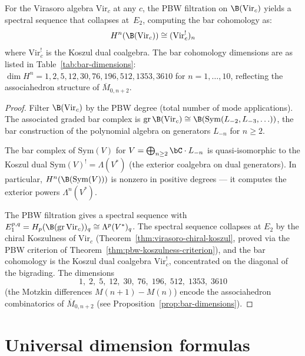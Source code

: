 \begin{proposition}
\label{prop:virasoro-koszul-acyclic}
For the Virasoro algebra $\mathrm{Vir}_c$ at any $c$, the PBW filtration
on $\B(\mathrm{Vir}_c)$ yields a spectral sequence that collapses
at~$E_2$, computing the bar cohomology as:
\begin{equation}\label{eq:virasoro-koszul-acyclic}
H^n(\B(\mathrm{Vir}_c)) \cong (\mathrm{Vir}_c^!)_n
\end{equation}
where $\mathrm{Vir}_c^!$ is the Koszul dual coalgebra.
The bar cohomology dimensions are as listed in
Table~\textup{\ref{tab:bar-dimensions}}:
$\dim H^n = 1, 2, 5, 12, 30, 76, 196, 512, 1353, 3610$ for $n = 1, \ldots, 10$,
reflecting the associahedron structure of
$\overline{M}_{0,n+2}$.
\end{proposition}

\begin{proof}
Filter $\B(\mathrm{Vir}_c)$ by the PBW degree (total number
of mode applications).  The associated graded bar complex is
$\mathrm{gr}\,\B(\mathrm{Vir}_c)
\cong \B(\mathrm{Sym}(L_{-2}, L_{-3}, \ldots))$,
the bar construction of the polynomial algebra on generators
$L_{-n}$ for $n \geq 2$.

The bar complex of $\mathrm{Sym}(V)$ for $V = \bigoplus_{n \geq 2}
\bC \cdot L_{-n}$ is quasi-isomorphic to the Koszul dual
$\mathrm{Sym}(V)^! = \Lambda(V^*)$ (the exterior coalgebra on dual
generators).  In particular, $H^n(\B(\mathrm{Sym}(V)))$ is nonzero
in positive degrees --- it computes the exterior powers $\Lambda^n(V^*)$.

The PBW filtration gives a spectral sequence with
$E_1^{p,q} = H_p(\B(\mathrm{gr}\,\mathrm{Vir}_c))_q
\cong \Lambda^p(V^*)_q$.
The spectral sequence collapses at $E_2$ by the chiral
Koszulness of $\mathrm{Vir}_c$
(Theorem~\ref{thm:virasoro-chiral-koszul}, proved via
the PBW criterion of Theorem~\ref{thm:pbw-koszulness-criterion}),
and the bar cohomology is the Koszul dual coalgebra
$\mathrm{Vir}_c^!$, concentrated on the diagonal of the bigrading.
The dimensions
\[
1,\; 2,\; 5,\; 12,\; 30,\; 76,\; 196,\; 512,\; 1353,\; 3610
\]
(the Motzkin differences $M(n{+}1) - M(n)$) encode the associahedron
combinatorics of $\overline{M}_{0,n+2}$
(see Proposition~\ref{prop:bar-dimensions}).
\end{proof}


\section{Universal dimension formulas}
\label{sec:universal-dim-formulas}

